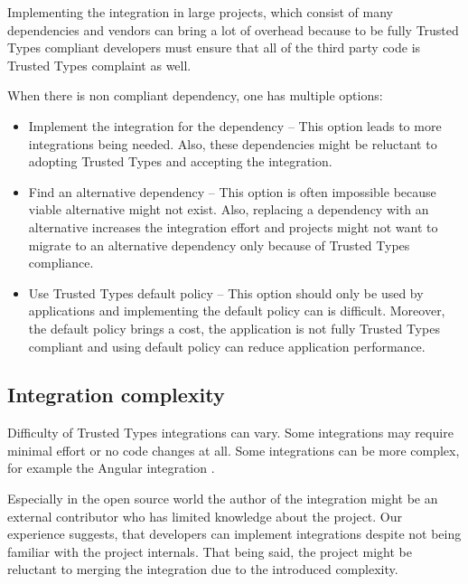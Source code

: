 Implementing the integration in large projects, which consist of many dependencies and vendors can
bring a lot of overhead because to be fully Trusted Types compliant developers must ensure that all
of the third party code is Trusted Types complaint as well.

When there is non compliant dependency, one has multiple options:

\begin{itemize}
  \item Implement the integration for the dependency -- This option leads to more integrations being
        needed. Also, these dependencies might be reluctant to adopting Trusted Types and accepting
        the integration.
  \item Find an alternative dependency -- This option is often impossible because viable alternative
        might not exist. Also, replacing a dependency with an alternative increases the integration
        effort and projects might not want to migrate to an alternative dependency only because of
        Trusted Types compliance.
  \item Use Trusted Types default policy -- This option should only be used by applications and
        implementing the default policy can is difficult. Moreover, the default policy brings a
        cost, the application is not fully Trusted Types compliant and using default policy can
        reduce application performance.
\end{itemize}

\subsection{Integration complexity}
\label{sub:trust_integration_author}

Difficulty of Trusted Types integrations can vary. Some integrations may require minimal effort or
no code changes at all. Some integrations can be more complex, for example the Angular integration
\cite{tt_web_framework_paper}.

Especially in the open source world the author of the integration might be an external contributor
who has limited knowledge about the project. Our experience suggests, that developers can implement
integrations despite not being familiar with the project internals. That being said, the project
might be reluctant to merging the integration due to the introduced complexity.
